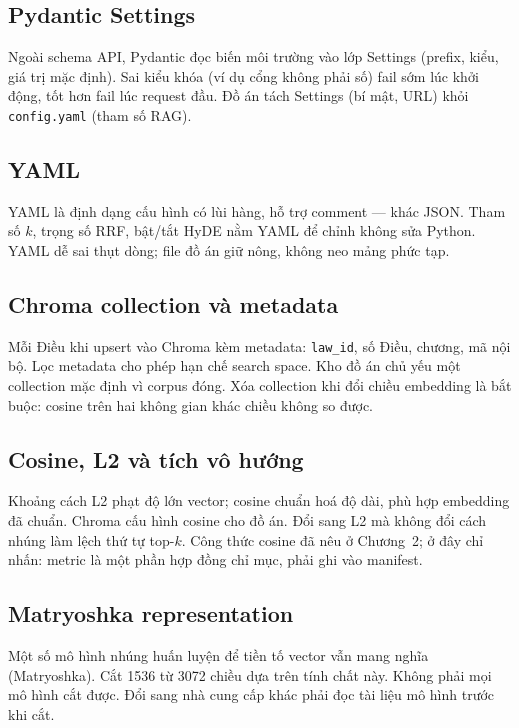 \subsection{Pydantic Settings}

Ngoài schema API, Pydantic đọc biến môi trường vào lớp Settings (prefix, kiểu,
giá trị mặc định). Sai kiểu khóa (ví dụ cổng không phải số) fail sớm lúc khởi
động, tốt hơn fail lúc request đầu. Đồ án tách Settings (bí mật, URL) khỏi
\texttt{config.yaml} (tham số RAG).

\subsection{YAML}

YAML là định dạng cấu hình có lùi hàng, hỗ trợ comment --- khác JSON. Tham số
$k$, trọng số RRF, bật/tắt HyDE nằm YAML để chỉnh không sửa Python. YAML dễ sai
thụt dòng; file đồ án giữ nông, không neo mảng phức tạp.

\subsection{Chroma collection và metadata}

Mỗi Điều khi upsert vào Chroma kèm metadata: \texttt{law\_id}, số Điều, chương,
mã nội bộ. Lọc metadata cho phép hạn chế search space. Kho đồ án chủ yếu một
collection mặc định vì corpus đóng. Xóa collection khi đổi chiều embedding là
bắt buộc: cosine trên hai không gian khác chiều không so được.

\subsection{Cosine, L2 và tích vô hướng}

Khoảng cách L2 phạt độ lớn vector; cosine chuẩn hoá độ dài, phù hợp embedding
đã chuẩn. Chroma cấu hình cosine cho đồ án. Đổi sang L2 mà không đổi cách nhúng
làm lệch thứ tự top-$k$. Công thức cosine đã nêu ở Chương~2; ở đây chỉ nhấn:
metric là một phần hợp đồng chỉ mục, phải ghi vào manifest.

\subsection{Matryoshka representation}

Một số mô hình nhúng huấn luyện để tiền tố vector vẫn mang nghĩa (Matryoshka).
Cắt 1536 từ 3072 chiều dựa trên tính chất này. Không phải mọi mô hình cắt được.
Đổi sang nhà cung cấp khác phải đọc tài liệu mô hình trước khi cắt.

